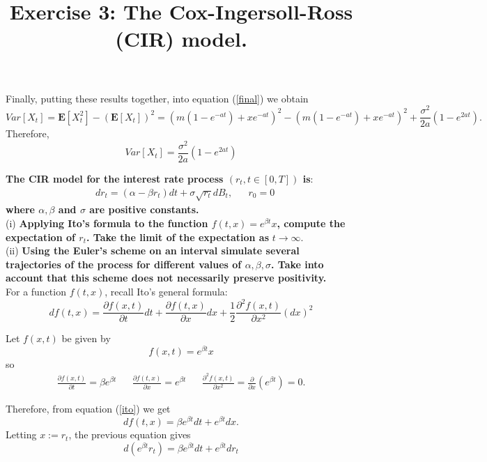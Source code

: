 \documentclass[12pt]{article}
\begin{document}
Finally, putting these results together, into equation (\ref{final}) we obtain
\begin{equation}
Var[X_t] =  \mathbf{E}[X_t^2]-(\mathbf{E}[X_t])^2 = (m(1-e^{-at}) + x e^{-at} )^2 - (m(1-e^{-at}) + x e^{-at} )^2+ \frac{\sigma^2}{2a} (1-e^{2at}).
\end{equation}
Therefore,
\begin{equation}
\boxed{Var[X_t] =   \frac{\sigma^2}{2a} (1-e^{2at})}
\end{equation}


\pagebreak

\title {{\bf Exercise 3:} {\bf The Cox-Ingersoll-Ross (CIR) model. }}
{\bf The CIR model for the interest rate process $(r_t, t\in[0,T])$ is}:
\begin{align*}
& dr_t = (\alpha - \beta r_t)dt + \sigma \sqrt{r_t}dB_t, && r_0=0
\end{align*} 
{\bf where $\alpha, \beta$ and $\sigma$ are positive constants.} \\

(i) {\bf Applying Ito's formula to the function $f(t,x)=e^{\beta t} x$, compute the expectation of $r_t$. Take the limit of the expectation as} $t\longrightarrow \infty$.\\

(ii) {\bf Using the Euler's scheme on an interval simulate several trajectories of the process for different values of $\alpha, \beta,\sigma$. Take into account that this scheme does not necessarily preserve positivity.} \\

For a function $f(t,x)$, recall Ito's general formula:
\begin{equation}\label{ito}
df(t,x) = \frac{\partial f(x,t)}{\partial t} dt + \frac{\partial f(t,x)}{\partial x}dx + \frac{1}{2}\frac{\partial^2f(x,t)}{\partial x^2}(dx)^2
\end{equation}

Let $f(x,t)$ be given by
\begin{equation}
f(x,t)= e^{\beta t}x
\end{equation}
so
\begin{align}
 \frac{\partial f(x,t)}{\partial t}= \beta e^{\beta t} &&
 \frac{\partial f(t,x)}{\partial x} = e^{\beta t} &&
 \frac{\partial^2f(x,t)}{\partial x^2} = \frac{\partial}{\partial x} (e^{\beta t}) = 0 .
\end{align}

Therefore, from equation (\ref{ito}) we get
\begin{equation}
df(t,x) =  \beta e^{\beta t}dt + e^{\beta t} dx.
\end{equation}
Letting $x := r_t$, the previous equation gives
\begin{equation}\label{dif}
d( e^{\beta t} r_t) =  \beta e^{\beta t}dt + e^{\beta t} dr_t
\end{equation}
\end{document}

